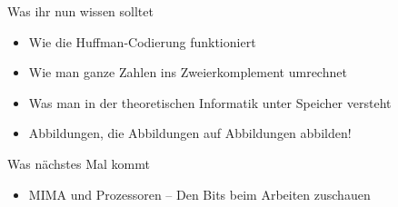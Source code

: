 

\begin{frame}	
	\begin{block}{Was ihr nun wissen solltet}
		\begin{itemize}
			\item Wie die Huffman-Codierung funktioniert
			\item Wie man ganze Zahlen ins Zweierkomplement umrechnet
			\item Was man in der theoretischen Informatik unter Speicher versteht
			\item Abbildungen, die Abbildungen auf Abbildungen abbilden!
		\end{itemize}
	\end{block}
	
	\begin{block}{Was nächstes Mal kommt}
		\begin{itemize}
			\item MIMA und Prozessoren – Den Bits beim Arbeiten zuschauen
		\end{itemize}
	\end{block}
\end{frame}

\slideThanks

